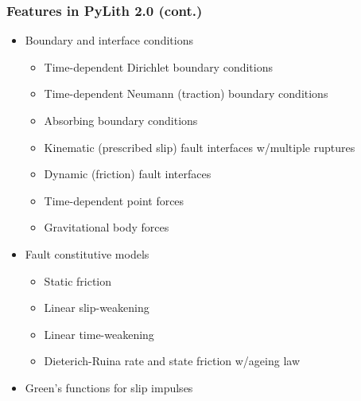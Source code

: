 \documentclass{beamer}
\begin{document}
\begin{frame}
  \frametitle{Features in PyLith 2.0 (cont.)}
  \summary{}

  \begin{itemize}
  \item Boundary and interface conditions
    \begin{itemize}
    \item Time-dependent Dirichlet boundary conditions
    \item Time-dependent Neumann (traction) boundary conditions
    \item Absorbing boundary conditions
    \item Kinematic (prescribed slip) fault interfaces w/multiple ruptures
    \item Dynamic (friction) fault interfaces
    \item Time-dependent point forces
    \item Gravitational body forces
    \end{itemize}
  \item Fault constitutive models
    \begin{itemize}
    \item Static friction
    \item Linear slip-weakening
    \item Linear time-weakening
    \item Dieterich-Ruina rate and state friction w/ageing law
    \end{itemize}
  \item Green's functions for slip impulses
 \end{itemize}

\end{frame}
\end{document}
